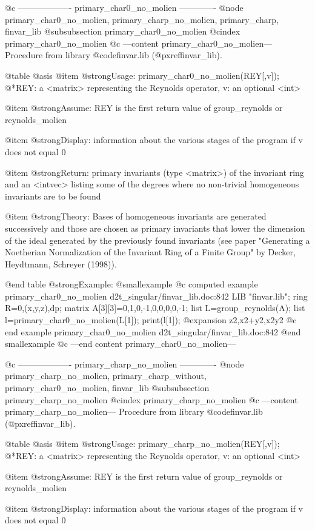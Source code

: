 @c ------------------- primary_char0_no_molien -------------
@node primary_char0_no_molien, primary_charp_no_molien, primary_charp, finvar_lib
@subsubsection primary_char0_no_molien
@cindex primary_char0_no_molien
@c ---content primary_char0_no_molien---
Procedure from library @code{finvar.lib} (@pxref{finvar_lib}).

@table @asis
@item @strong{Usage:}
primary_char0_no_molien(REY[,v]);
@*REY: a <matrix> representing the Reynolds operator, v: an optional
<int>

@item @strong{Assume:}
REY is the first return value of group_reynolds or reynolds_molien

@item @strong{Display:}
information about the various stages of the program if v does not
equal 0

@item @strong{Return:}
primary invariants (type <matrix>) of the invariant ring and an
<intvec> listing some of the degrees where no non-trivial homogeneous
invariants are to be found

@item @strong{Theory:}
Bases of homogeneous invariants are generated successively and those
are chosen as primary invariants that lower the dimension of the ideal
generated by the previously found invariants (see paper "Generating a
Noetherian Normalization of the Invariant Ring of a Finite Group" by
Decker, Heydtmann, Schreyer (1998)).

@end table
@strong{Example:}
@smallexample
@c computed example primary_char0_no_molien d2t_singular/finvar_lib.doc:842 
LIB "finvar.lib";
ring R=0,(x,y,z),dp;
matrix A[3][3]=0,1,0,-1,0,0,0,0,-1;
list L=group_reynolds(A);
list l=primary_char0_no_molien(L[1]);
print(l[1]);
@expansion{} z2,x2+y2,x2y2
@c end example primary_char0_no_molien d2t_singular/finvar_lib.doc:842
@end smallexample
@c ---end content primary_char0_no_molien---

@c ------------------- primary_charp_no_molien -------------
@node primary_charp_no_molien, primary_charp_without, primary_char0_no_molien, finvar_lib
@subsubsection primary_charp_no_molien
@cindex primary_charp_no_molien
@c ---content primary_charp_no_molien---
Procedure from library @code{finvar.lib} (@pxref{finvar_lib}).

@table @asis
@item @strong{Usage:}
primary_charp_no_molien(REY[,v]);
@*REY: a <matrix> representing the Reynolds operator, v: an optional
<int>

@item @strong{Assume:}
REY is the first return value of group_reynolds or reynolds_molien

@item @strong{Display:}
information about the various stages of the program if v does not
equal 0

